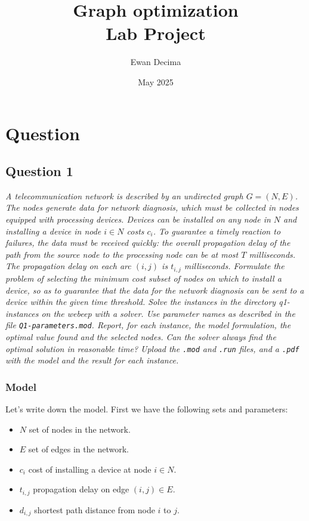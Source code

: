 \documentclass[10pt]{article}
\title{Graph optimization \\ Lab Project}
\author{Ewan Decima}
\date{May 2025}
\begin{document}
    \maketitle

    \section{Question}

    \subsection*{Question 1}
    \textit{A telecommunication network is described by an undirected graph $G=(N,E)$. The nodes generate data for network diagnosis, which must be collected in nodes equipped with processing devices. Devices can be installed on any node in $N$ and installing a device in node $i \in N$ costs $c_i$. To guarantee a timely reaction to failures, the data must be received quickly: the overall propagation delay of the path from the source node to the processing node can be at most $T$ milliseconds. The propagation delay on each arc $(i,j)$ is $t_{i,j}$ milliseconds. Formulate the problem of selecting the minimum cost subset of nodes on which to install a device, so as to guarantee that the data for the network diagnosis can be sent to a device within the given time threshold.
    Solve the instances in the directory q1-instances on the webeep with a solver. Use parameter names as described in the file \texttt{Q1-parameters.mod}.
    Report, for each instance, the model formulation, the optimal value found and the selected nodes. Can the solver always find the optimal solution in reasonable time? Upload the \texttt{.mod} and \texttt{.run} files, and a \texttt{.pdf} with the model and the result for each instance.}

    \vspace{1 cm}

    \subsubsection{Model}
    Let's write down the model. First we have the following sets and parameters:
    \begin{itemize}
        \item $N$ set of nodes in the network.
        \item $E$ set of edges in the network.
        \item $c_i$ cost of installing a device at node $i \in N$.
        \item $t_{i,j}$ propagation delay on edge $(i,j) \in E$.
        \item $d_{i,j}$ shortest path distance from node $i$ to $j$.
    \end{itemize}
\end{document}
